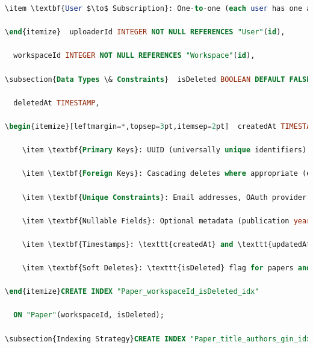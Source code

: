 \begin{itemize}[leftmargin=*,topsep=3pt,itemsep=2pt]
\begin{lstlisting}[language=SQL, caption={Paper Table Schema}]
    \item \textbf{User $\to$ Subscription}: One-to-one (each user has one active subscription)  fileType VARCHAR(50) NOT NULL,

\end{itemize}  uploaderId INTEGER NOT NULL REFERENCES "User"(id),

  workspaceId INTEGER NOT NULL REFERENCES "Workspace"(id),

\subsection{Data Types \& Constraints}  isDeleted BOOLEAN DEFAULT FALSE,

  deletedAt TIMESTAMP,

\begin{itemize}[leftmargin=*,topsep=3pt,itemsep=2pt]  createdAt TIMESTAMP DEFAULT NOW(),

    \item \textbf{Primary Keys}: UUID (universally unique identifiers) for all tables  updatedAt TIMESTAMP DEFAULT NOW()

    \item \textbf{Foreign Keys}: Cascading deletes where appropriate (e.g., deleting user deletes sessions));

    \item \textbf{Unique Constraints}: Email addresses, OAuth provider accounts

    \item \textbf{Nullable Fields}: Optional metadata (publication year, DOI, journal)-- Performance Indexes

    \item \textbf{Timestamps}: \texttt{createdAt} and \texttt{updatedAt} on all tablesCREATE INDEX "Paper_uploaderId_workspaceId_idx" 

    \item \textbf{Soft Deletes}: \texttt{isDeleted} flag for papers and collections  ON "Paper"(uploaderId, workspaceId);

\end{itemize}CREATE INDEX "Paper_workspaceId_isDeleted_idx" 

  ON "Paper"(workspaceId, isDeleted);

\subsection{Indexing Strategy}CREATE INDEX "Paper_title_authors_gin_idx" 


\end{lstlisting}
\end{itemize}
